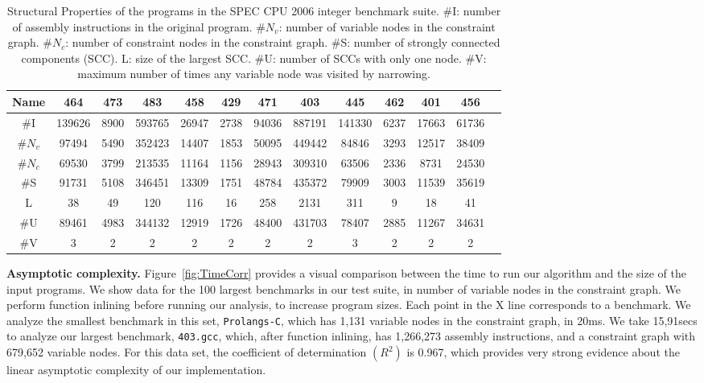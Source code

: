 \documentclass{llncs}
\begin{document}
\begin{table}[t!]
\begin{center}
\begin{scriptsize}
\renewcommand{\tabcolsep}{0.1cm}
\begin{tabular}{|c|c|c|c|c|c|c|c|c|c|c|c|c|} \hline
Name	    & 464 &	473 & 483 & 458 & 429 & 471 & 403 & 445 & 462 & 401 & 456 \\ \hline
\#I  & 139626 & 8900 & 593765 & 26947 & 2738 & 94036 & 887191 & 141330 &  6237 & 17663 & 61736 \\ \hline
\#$N_v$ & 97494 & 5490 & 352423 & 14407 & 1853	 & 50095 & 449442 & 84846 & 3293 & 12517 & 38409 \\ \hline
\#$N_c$ & 69530 & 3799 & 213535 & 11164 & 1156 & 28943 & 309310 & 63506 & 2336 & 8731 & 24530 \\ \hline
\#S  & 91731 & 5108 & 346451 & 13309 & 1751 & 48784 & 435372 & 79909 & 3003 & 11539 & 35619 \\ \hline
L    & 38 & 49 & 120 & 116 & 16 & 258 & 2131 & 311 & 9 & 18 & 41  \\ \hline
\#U  & 89461 & 4983 & 344132 & 12919 & 1726 & 48400 & 431703 & 78407 & 2885 & 11267 & 34631 \\ \hline
\#V  & 3	& 2 & 2 & 2 & 2 & 2 & 2 & 3 & 2 & 2 & 2 \\ \hline
\end{tabular}
\end{scriptsize}
\end{center}
\caption{\label{tab:struct}Structural Properties of the programs in the SPEC CPU
2006 integer benchmark suite.
\#I: number of assembly instructions in the original program.
\#$N_v$: number of variable nodes in the constraint graph.
\#$N_c$: number of constraint nodes in the constraint graph.
\#S: number of strongly connected components (SCC).
L: size of the largest SCC.
\#U: number of SCCs with only one node.
\#V: maximum number of times any variable node was visited by narrowing.}
\end{table}%



\noindent
\textbf{Asymptotic complexity.}
Figure~\ref{fig:TimeCorr} provides a visual comparison between the time to
run our algorithm and the size of the input programs.
We show data for the 100 largest benchmarks in our test suite, in number
of variable nodes in the constraint graph.
We perform function inlining before running our analysis, to increase program
sizes.
Each point in the X line corresponds to a benchmark.
We analyze the smallest benchmark in this set, \texttt{Prolangs-C}, which has
1,131 variable nodes in the constraint graph, in 20ms.
We take 15,91secs to analyze our largest benchmark, \texttt{403.gcc}, which,
after function inlining, has 1,266,273 assembly instructions, and a
constraint graph with 679,652 variable nodes.
For this data set, the coefficient of determination $(R^2)$ is 0.967, which
provides very strong evidence about the linear asymptotic complexity of our
implementation.
\end{document}
